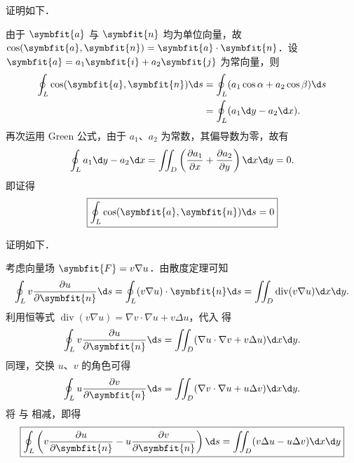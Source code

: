 \begin{myproof}
     证明如下．

    由于 $\symbfit{a}$ 与 $\symbfit{n}$ 均为单位向量，故 $\cos(\symbfit{a}, \symbfit{n}) = \symbfit{a} \cdot \symbfit{n}$．设 $\symbfit{a} = a_1 \symbfit{i} + a_2 \symbfit{j}$ 为常向量，则
    \begin{equation}
        \begin{aligned}
            \oint_{L} \cos(\symbfit{a}, \symbfit{n}) \d s & = \oint_{L} (a_1 \cos \alpha + a_2 \cos \beta) \d s \\
                                                          & = \oint_{L} (a_1 \d y - a_2 \d x).
        \end{aligned}
    \end{equation}
    再次运用 Green 公式，由于 $a_1$、$a_2$ 为常数，其偏导数为零，故有
    \begin{equation}
        \oint_{L} a_1 \d y - a_2 \d x = \iint_{D} \left( \frac{\partial a_1}{\partial x} + \frac{\partial a_2}{\partial y} \right) \d x \d y = 0.
    \end{equation}
    即证得
    \begin{equation}
        \boxed{\oint_{L} \cos(\symbfit{a}, \symbfit{n}) \d s = 0}
    \end{equation}

     证明如下．

    考虑向量场 $\symbfit{F} = v \nabla u$．由散度定理可知
    \begin{equation}\label{eq:first-green-prep}
        \oint_{L} v \frac{\partial u}{\partial \symbfit{n}} \d s = \oint_{L} (v \nabla u) \cdot \symbfit{n} \d s = \iint_{D} \operatorname{div} (v \nabla u) \d x \d y.
    \end{equation}
    利用恒等式 $\operatorname{div} (v \nabla u) = \nabla v \cdot \nabla u + v \Delta u$，代入  得
    \begin{equation}\label{eq:first-green}
        \oint_{L} v \frac{\partial u}{\partial \symbfit{n}} \d s = \iint_{D} (\nabla u \cdot \nabla v + v \Delta u) \d x \d y.
    \end{equation}
    同理，交换 $u$、$v$ 的角色可得
    \begin{equation}\label{eq:first-green-alt}
        \oint_{L} u \frac{\partial v}{\partial \symbfit{n}} \d s = \iint_{D} (\nabla v \cdot \nabla u + u \Delta v) \d x \d y.
    \end{equation}
    将  与  相减，即得
    \begin{equation}
        \boxed{\oint_{L} \left( v \frac{\partial u}{\partial \symbfit{n}} - u \frac{\partial v}{\partial \symbfit{n}} \right) \d s = \iint_{D} (v \Delta u - u \Delta v) \d x \d y}
    \end{equation}
\end{myproof}

\endinput
